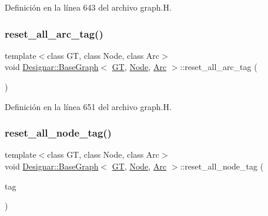 Definición en la línea 643 del archivo graph.\+H.

\mbox{\label{class_designar_1_1_base_graph_af9ae2a4dfd676090de4b4fa04414989c}} 
\subsubsection{\texorpdfstring{reset\+\_\+all\+\_\+arc\+\_\+tag()}{reset\_all\_arc\_tag()}\hspace{0.1cm}{\footnotesize\ttfamily [2/2]}}
{\footnotesize\ttfamily template$<$class GT, class Node, class Arc$>$ \\
void \hyperlink{class_designar_1_1_base_graph}{Designar\+::\+Base\+Graph}$<$ \hyperlink{demo-buildgraph_8_c_a3001c40d2c31ca87ed96cd7d1334a55e}{GT}, \hyperlink{namespace_designar_a5af326c65aa2bd26b26c410f2030d09e}{Node}, \hyperlink{namespace_designar_a3f55fb5513d62ff47cbc8f72b8e95d6f}{Arc} $>$\+::reset\+\_\+all\+\_\+arc\+\_\+tag (\begin{DoxyParamCaption}{ }\end{DoxyParamCaption})\hspace{0.3cm}{\ttfamily [inline]}}



Definición en la línea 651 del archivo graph.\+H.

\mbox{\label{class_designar_1_1_base_graph_a07ca1909d77210157b8b9571a4d35d6c}} 
\subsubsection{\texorpdfstring{reset\+\_\+all\+\_\+node\+\_\+tag()}{reset\_all\_node\_tag()}\hspace{0.1cm}{\footnotesize\ttfamily [1/2]}}
{\footnotesize\ttfamily template$<$class GT, class Node, class Arc$>$ \\
void \hyperlink{class_designar_1_1_base_graph}{Designar\+::\+Base\+Graph}$<$ \hyperlink{demo-buildgraph_8_c_a3001c40d2c31ca87ed96cd7d1334a55e}{GT}, \hyperlink{namespace_designar_a5af326c65aa2bd26b26c410f2030d09e}{Node}, \hyperlink{namespace_designar_a3f55fb5513d62ff47cbc8f72b8e95d6f}{Arc} $>$\+::reset\+\_\+all\+\_\+node\+\_\+tag (\begin{DoxyParamCaption}\item[{\hyperlink{namespace_designar_ac91366256ea6ea6ac5fd483d55a7499e}{Graph\+Tag}}]{tag }\end{DoxyParamCaption})\hspace{0.3cm}{\ttfamily [inline]}}



